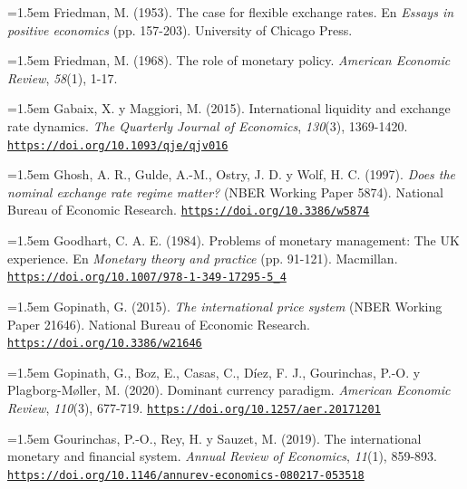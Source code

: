 \documentclass[10pt,a4paper]{article}
\begin{document}
{\sloppy\noindent\hangindent=1.5em Friedman, M. (1953). The case for flexible exchange rates. En \textit{Essays in positive economics} (pp. 157-203). University of Chicago Press.\par}

{\sloppy\noindent\hangindent=1.5em Friedman, M. (1968). The role of monetary policy. \textit{American Economic Review}, \textit{58}(1), 1-17.\par}

{\sloppy\noindent\hangindent=1.5em Gabaix, X. y Maggiori, M. (2015). International liquidity and exchange rate dynamics. \textit{The Quarterly Journal of Economics}, \textit{130}(3), 1369-1420. \href{https://doi.org/10.1093/qje/qjv016}{\nolinkurl{https://doi.org/10.1093/qje/qjv016}}\par}

{\sloppy\noindent\hangindent=1.5em Ghosh, A. R., Gulde, A.-M., Ostry, J. D. y Wolf, H. C. (1997). \textit{Does the nominal exchange rate regime matter?} (NBER Working Paper 5874). National Bureau of Economic Research. \href{https://doi.org/10.3386/w5874}{\nolinkurl{https://doi.org/10.3386/w5874}}\par}

{\sloppy\noindent\hangindent=1.5em Goodhart, C. A. E. (1984). Problems of monetary management: The UK experience. En \textit{Monetary theory and practice} (pp. 91-121). Macmillan. \href{https://doi.org/10.1007/978-1-349-17295-5_4}{\nolinkurl{https://doi.org/10.1007/978-1-349-17295-5_4}}\par}

{\sloppy\noindent\hangindent=1.5em Gopinath, G. (2015). \textit{The international price system} (NBER Working Paper 21646). National Bureau of Economic Research. \href{https://doi.org/10.3386/w21646}{\nolinkurl{https://doi.org/10.3386/w21646}}\par}

{\sloppy\noindent\hangindent=1.5em Gopinath, G., Boz, E., Casas, C., Díez, F. J., Gourinchas, P.-O. y Plagborg-Møller, M. (2020). Dominant currency paradigm. \textit{American Economic Review}, \textit{110}(3), 677-719. \href{https://doi.org/10.1257/aer.20171201}{\nolinkurl{https://doi.org/10.1257/aer.20171201}}\par}

{\sloppy\noindent\hangindent=1.5em Gourinchas, P.-O., Rey, H. y Sauzet, M. (2019). The international monetary and financial system. \textit{Annual Review of Economics}, \textit{11}(1), 859-893. \href{https://doi.org/10.1146/annurev-economics-080217-053518}{\nolinkurl{https://doi.org/10.1146/annurev-economics-080217-053518}}\par}
\end{document}
